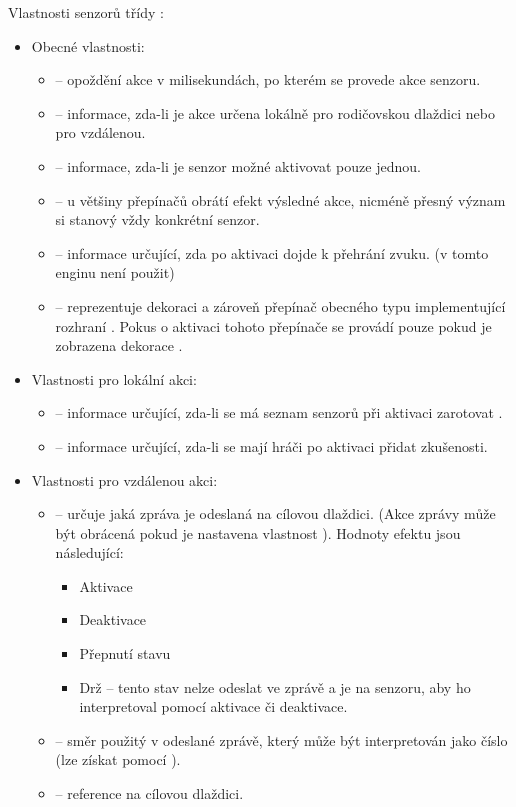 Vlastnosti senzorů třídy :
\begin{itemize}
\item Obecné vlastnosti:
	\begin{itemize}
	\item {} -- opoždění akce v milisekundách, po kterém se provede akce senzoru.
	\item {} -- informace, zda-li je akce určena lokálně pro rodičovskou dlaždici nebo pro vzdálenou.
	\item {} -- informace, zda-li je senzor možné aktivovat pouze jednou.
	\item {} -- u většiny přepínačů obrátí efekt výsledné akce, nicméně přesný význam si stanový vždy konkrétní senzor. 
	\item {} -- informace určující, zda po aktivaci dojde k přehrání zvuku.  (v tomto enginu není použit)
	\item {} -- reprezentuje dekoraci a zároveň přepínač obecného typu implementující rozhraní .
			Pokus o aktivaci tohoto přepínače se provádí pouze pokud je zobrazena dekorace .
	\end{itemize}

\item Vlastnosti pro lokální akci:
	\begin{itemize}
	\item {} -- informace určující, zda-li se má seznam senzorů při aktivaci zarotovat .
	\item {} -- informace určující, zda-li se mají hráči po aktivaci přidat zkušenosti.
	\end{itemize}

\item Vlastnosti pro vzdálenou akci:
	\begin{itemize}
	\item {} -- určuje jaká zpráva je odeslaná na cílovou dlaždici.  (Akce zprávy může být obrácená pokud je nastavena vlastnost ).
	Hodnoty efektu jsou následující:
		\begin{itemize}
		\item Aktivace 
		\item Deaktivace
		\item Přepnutí stavu
		\item Drž -- tento stav nelze odeslat ve zprávě a je na senzoru, aby ho interpretoval pomocí aktivace či deaktivace.
		\end{itemize}
	\item {} -- směr použitý v odeslané zprávě, který může být interpretován jako číslo (lze získat pomocí ).
	\item {} -- reference na cílovou dlaždici.
	\end{itemize}
\end{itemize}


